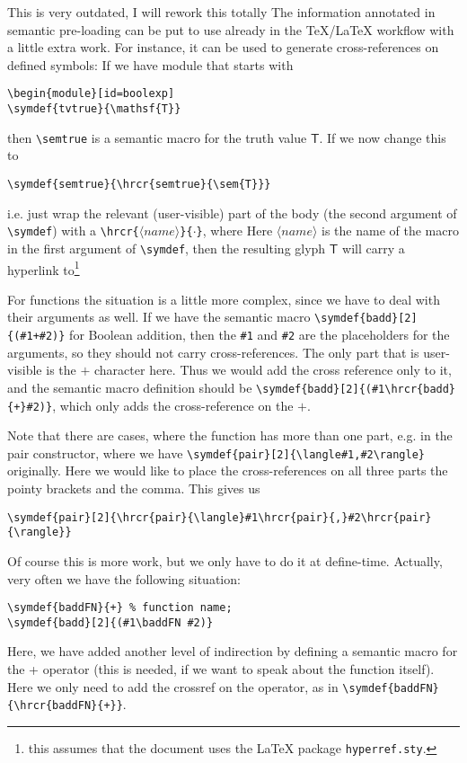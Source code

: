 \begin{oldpart}{This is very outdated, I will rework this totally}
The information annotated in semantic pre-loading can be put to use already in the
{\TeX/\LaTeX} workflow with a little extra work. For instance, it can be used to generate
cross-references on defined symbols: If we have module that starts with 
\begin{verbatim}
\begin{module}[id=boolexp]
\symdef{tvtrue}{\mathsf{T}}
\end{verbatim}
then {\verb|\semtrue|} is a semantic macro for the truth value ${\mathsf{T}}$. If we now
change this to 
\begin{verbatim}
\symdef{semtrue}{\hrcr{semtrue}{\sem{T}}}
\end{verbatim}
i.e. just wrap the relevant (user-visible) part of the body (the second  argument of
{\verb|\symdef|}) with a {\verb|\hrcr{|$\langle name\rangle$\verb|}{|$\cdot$\verb|}|}, where
Here $\langle name\rangle$ is the name  of the  macro in the first
argument of {\verb|\symdef|}, then the resulting glyph  ${\mathsf{T}}$ will carry a
hyperlink to\footnote{this assumes that the
document uses the {\LaTeX} package {\tt{hyperref.sty}}.}

For functions the situation is a little more complex, since we have to  deal with their
arguments as well. If we have the semantic macro 
{\verb|\symdef{badd}[2]{(#1+#2)}|} for Boolean addition, then the {\verb|#1|} and
{\verb|#2|} are the placeholders for the arguments, so they should not carry
cross-references. The only part  that is user-visible is the $+$ character here. Thus we
would add the cross reference only to it, and the semantic macro definition
should be  {\verb|\symdef{badd}[2]{(#1\hrcr{badd}{+}#2)}|}, which only adds the  cross-reference
on the $+$. 

Note that there are cases, where the  function has more than one part,
e.g. in the pair constructor, where we  have {\verb|\symdef{pair}[2]{\langle#1,#2\rangle}|}
originally. Here we would  like to place the cross-references on all three parts the
pointy  brackets and the comma. This gives us
\begin{verbatim}
\symdef{pair}[2]{\hrcr{pair}{\langle}#1\hrcr{pair}{,}#2\hrcr{pair}{\rangle}}
\end{verbatim}
Of course this is more work, but we only have to do it at  define-time. 
Actually, very often we have the following situation:

\begin{verbatim}
\symdef{baddFN}{+} % function name;
\symdef{badd}[2]{(#1\baddFN #2)}
\end{verbatim}

Here, we have added another level of indirection by defining a semantic  macro for the +
operator (this is needed, if we want to speak about the  function itself). Here we only
need to add the crossref on the  operator, as in {\verb|\symdef{baddFN}{\hrcr{baddFN}{+}}|}. 
\end{oldpart}
